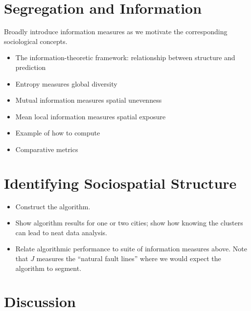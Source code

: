 \documentclass[english]{scrartcl}
\begin{document}
\section{Segregation and Information} \label{sec:information}
	Broadly introduce information measures as we motivate the corresponding sociological concepts. 
	\begin{itemize}
		\item The information-theoretic framework: relationship between structure and prediction
		\item Entropy measures global diversity
		\item Mutual information measures spatial unevenness
		\item Mean local information measures spatial exposure
		\item Example of how to compute
		\item Comparative metrics
	\end{itemize}

\section{Identifying Sociospatial Structure} \label{sec:id}
	\begin{itemize}
		\item Construct the algorithm. 
		\item Show algorithm results for one or two cities; show how knowing the clusters can lead to neat data analysis. 
		\item Relate algorithmic performance to suite of information measures above. Note that $J$ measures the ``natural fault lines'' where we would expect the algorithm to segment.  
	\end{itemize}

\section{Discussion} \label{sec:discussion}

{}

\end{document}
